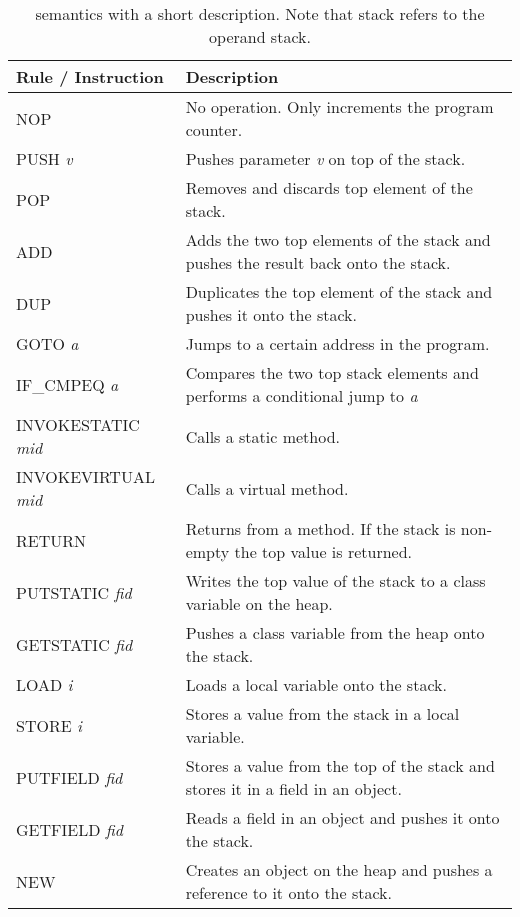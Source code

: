 \begin{table}
\centering
\begin{tabular}{p{}|p{}}
\label{tab:instr}
\textbf{Rule / Instruction}			  & \textbf{Description} \\ \hline
NOP             		  & No operation. Only increments the program counter. \\ \hline
PUSH \textit{v}           & Pushes parameter \textit{v} on top of the stack. \\ \hline
POP             		  & Removes and discards top element of the stack.\\ \hline
ADD             		  & Adds the two top elements of the stack and pushes the result back onto the stack.  \\ \hline
DUP             		  & Duplicates the top element of the stack and pushes it onto the stack. \\ \hline
GOTO \textit{a}           & Jumps to a certain address in the program.  \\ \hline
IF\_CMPEQ \textit{a}   	  & Compares the two top stack elements and performs a conditional jump to \textit{a}  \\ \hline
INVOKESTATIC \textit{mid}    		  & Calls a static method.  \\ \hline
INVOKEVIRTUAL \textit{mid}		  & Calls a virtual method.  \\ \hline
RETURN                    & Returns from a method. If the stack is non-empty the top value is returned.   \\ \hline
PUTSTATIC \textit{fid}  & Writes the top value of the stack to a class variable on the heap.  \\ \hline
GETSTATIC \textit{fid}  & Pushes a class variable from the heap onto the stack. \\ \hline
LOAD \textit{i}           & Loads a local variable onto the stack.  \\ \hline
STORE \textit{i}          & Stores a value from the stack in a local variable.\\ \hline
PUTFIELD \textit{fid}   & Stores a value from the top of the stack and stores it in a field in an object.   \\ \hline
GETFIELD \textit{fid}	  & Reads a field in an object and pushes it onto the stack. \\ \hline
NEW   		              & Creates an object on the heap and pushes a reference to it onto the stack.  \\ \hline  
\end{tabular}
\caption{\jcl semantics with a short description. Note that stack refers to the operand stack.}
\end{table}

